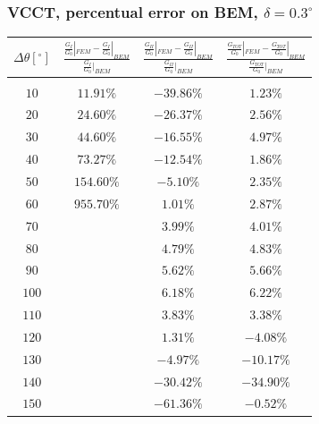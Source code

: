 \documentclass[first,firstsupp,lastsupp,handout,last,hyperref,table]{ETHclass}
\begin{document}
\begin{frame}
\frametitle{\small VCCT, percentual error on BEM, $\delta=0.3^{\circ}$}
\vspace{-0.5cm}
\scriptsize
\centering
\captionsetup[figure]{font=scriptsize,labelfont=scriptsize}
\begin{table}[htbp]
  \centering
    \begin{tabular}{cccc}
    $\Delta\theta \left[^{\circ}\right]$&$\frac{\frac{G_{I}}{G_{0}}|_{FEM}-\frac{G_{I}}{G_{0}}|_{BEM}}{\frac{G_{I}}{G_{0}}|_{BEM}}$&$\frac{\frac{G_{II}}{G_{0}}|_{FEM}-\frac{G_{II}}{G_{0}}|_{BEM}}{\frac{G_{II}}{G_{0}}|_{BEM}}$&$\frac{\frac{G_{TOT}}{G_{0}}|_{FEM}-\frac{G_{TOT}}{G_{0}}|_{BEM}}{\frac{G_{TOT}}{G_{0}}|_{BEM}}$\\
    \midrule\\
	$10$&$11.91\%$&$-39.86\%$&$1.23\%$\\
	$20$&$24.60\%$&$-26.37\%$&$2.56\%$\\
	$30$&$44.60\%$&$-16.55\%$&$4.97\%$\\
	$40$&$73.27\%$&$-12.54\%$&$1.86\%$\\
	$50$&$154.60\%$&$-5.10\%$&$2.35\%$\\
	$60$&$955.70\%$&$1.01\%$&$2.87\%$\\
	$70$&&$3.99\%$&$4.01\%$\\
	$80$&&$4.79\%$&$4.83\%$\\
	$90$&&$5.62\%$&$5.66\%$\\
	$100$&&$6.18\%$&$6.22\%$\\
	$110$&&$3.83\%$&$3.38\%$\\
	$120$&&$1.31\%$&$-4.08\%$\\
	$130$&&$-4.97\%$&$-10.17\%$\\
	$140$&&$-30.42\%$&$-34.90\%$\\
	$150$&&$-61.36\%$&$-0.52\%$\\
    \end{tabular}%
  \label{tab:phaseprop}%
\end{table}%
\end{frame}
\end{document}
